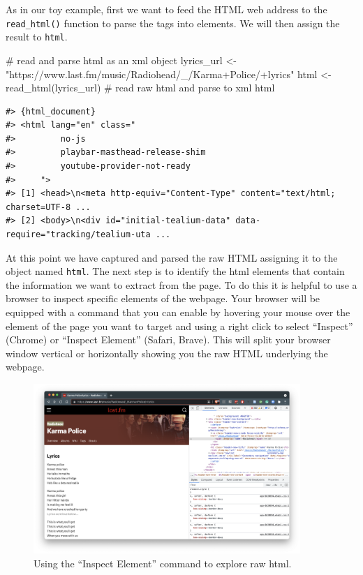 \documentclass[
  letterpaper,
]{latex/krantz}
\newenvironment{Shaded}{\begin{snugshade}}{\end{snugshade}}
\newcommand{\CommentTok}[1]{\textcolor[rgb]{0.37,0.37,0.37}{#1}}
\newcommand{\FunctionTok}[1]{\textcolor[rgb]{0.28,0.35,0.67}{#1}}
\newcommand{\NormalTok}[1]{\textcolor[rgb]{0.00,0.23,0.31}{#1}}
\newcommand{\OtherTok}[1]{\textcolor[rgb]{0.00,0.23,0.31}{#1}}
\newcommand{\StringTok}[1]{\textcolor[rgb]{0.13,0.47,0.30}{#1}}
\begin{document}
As in our toy example, first we want to feed the HTML web address to the
\texttt{read\_html()} function to parse the tags into elements. We will
then assign the result to \texttt{html}.

\begin{Shaded}
\begin{Highlighting}[]
\CommentTok{\# read and parse html as an xml object}
\NormalTok{lyrics\_url }\OtherTok{\textless{}{-}} \StringTok{"https://www.last.fm/music/Radiohead/\_/Karma+Police/+lyrics"}
\NormalTok{html }\OtherTok{\textless{}{-}} \FunctionTok{read\_html}\NormalTok{(lyrics\_url) }\CommentTok{\# read raw html and parse to xml}
\NormalTok{html}
\end{Highlighting}
\end{Shaded}

\begin{verbatim}
#> {html_document}
#> <html lang="en" class="
#>         no-js
#>         playbar-masthead-release-shim
#>         youtube-provider-not-ready
#>     ">
#> [1] <head>\n<meta http-equiv="Content-Type" content="text/html; charset=UTF-8 ...
#> [2] <body>\n<div id="initial-tealium-data" data-require="tracking/tealium-uta ...
\end{verbatim}

At this point we have captured and parsed the raw HTML assigning it to
the object named \texttt{html}. The next step is to identify the html
elements that contain the information we want to extract from the page.
To do this it is helpful to use a browser to inspect specific elements
of the webpage. Your browser will be equipped with a command that you
can enable by hovering your mouse over the element of the page you want
to target and using a right click to select ``Inspect'' (Chrome) or
``Inspect Element'' (Safari, Brave). This will split your browser window
vertical or horizontally showing you the raw HTML underlying the
webpage.

\begin{figure}[h]

{\centering \includegraphics[width=0.9\textwidth,height=\textheight]{./figures/acquire-data/ad-lastfm-artist-inspect.png}

}

\caption{\label{fig-ad-inspect-element-artist-lastfm}Using the ``Inspect
Element'' command to explore raw html.}

\end{figure}
\end{document}
